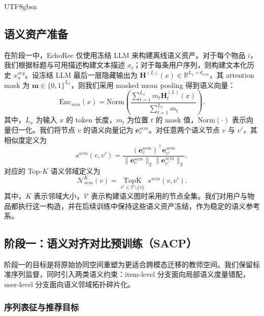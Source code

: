 \documentclass{article}
\begin{document}
\begin{CJK*}{UTF8}{gbsn}
\subsection{语义资产准备}

在阶段一中，EchoRec 仅使用冻结 LLM 来构建离线语义资产。对于每个物品 $i$，我们根据标题与可用描述构建文本描述 $x_i$；对于每条用户序列，则构建文本化历史 $x_u^{seq}$。设冻结 LLM 最后一层隐藏输出为 $\mathbf{H}^{(L)}(x)\in\mathbb{R}^{L_x\times d_{sem}}$，其 attention mask 为 $\mathbf{m}\in\{0,1\}^{L_x}$，则我们采用 masked mean pooling 得到语义向量：
\begin{equation}
\mathrm{Enc}_{sem}(x)=
\mathrm{Norm}\!\left(
\frac{\sum_{t=1}^{L_x} m_t \mathbf{H}^{(L)}_t(x)}
{\sum_{t=1}^{L_x} m_t}
\right).
\end{equation}
其中，$L_x$ 为输入 $x$ 的 token 长度，$m_t$ 为位置 $t$ 的 mask 值，$\mathrm{Norm}(\cdot)$ 表示向量归一化。我们将节点 $v$ 的语义向量记为 $\mathbf{e}_v^{sem}$。对任意两个语义节点 $v$ 与 $v'$，其相似度定义为
\begin{equation}
s^{sem}(v,v')
=
\frac{(\mathbf{e}_v^{sem})^\top \mathbf{e}_{v'}^{sem}}
{\|\mathbf{e}_v^{sem}\|_2\|\mathbf{e}_{v'}^{sem}\|_2},
\end{equation}
对应的 Top-$K$ 语义邻域定义为
\begin{equation}
\mathcal{N}_{sem}^{K}(v)
=
\operatorname*{TopK}_{v'\in\mathcal{V}\setminus\{v\}}
\ s^{sem}(v,v').
\end{equation}
其中，$K$ 表示邻域大小，$\mathcal{V}$ 表示构建语义图时采用的节点全集。我们对用户与物品都执行这一构造，并在后续训练中保持这些语义资产冻结，作为稳定的语义参考系。

\subsection{阶段一：语义对齐对比预训练（SACP）}

阶段一的目标是将原始协同空间重塑为更适合跨模态迁移的教师空间。我们保留标准序列监督，同时引入两类语义约束：item-level 分支面向局部语义度量错配，user-level 分支面向语义邻域拓扑碎片化。

\subsubsection{序列表征与推荐目标}


\end{CJK*}
\end{document}
